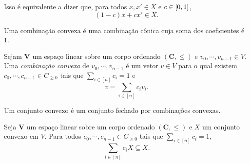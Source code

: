 Isso é equivalente a dizer que, para todos $x,x' \in X$ e $c \in \left[{0},{1}\right]$,
	\begin{equation*}
	(1-c)x + cx' \in X.
	\end{equation*}

Uma combinação convexa é uma combinação cônica cuja soma dos coeficientes é $1$.

\begin{definition}
Sejam $\bm V$ um espaço linear sobre um corpo ordenado $(\bm C,\leq)$ e $v_0,\cdots,v_{n-1} \in V$. Uma \emph{combinação convexa} de $v_0,\cdots,v_{n-1}$ é um vetor $v \in V$ para o qual existem $c_0,\cdots,c_{n-1} \in C_{\geq 0}$ tais que $\sum_{i \in [n]} c_i = 1$ e
	\begin{equation*}
	v = \sum_{i \in [n]} c_iv_i.
	\end{equation*}
\end{definition}

Um conjunto convexo é um conjunto fechado por combinações convexas.

\begin{proposition}
Seja $\bm V$ um espaço linear sobre um corpo ordenado $(\bm C,\leq)$ e $X$ um conjunto convexo em $V$. Para todos $c_0,\cdots,c_{n-1} \in C_{\geq 0}$ tais que $\sum_{i \in [n]} c_i = 1$,
	\begin{equation*}
	\sum_{i \in [n]} c_iX \subseteq X.
	\end{equation*}

\end{proposition}








